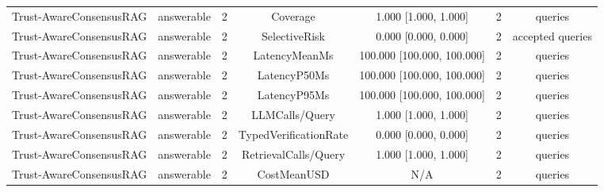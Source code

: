 {\begin{tabular}{lcccccc}
Trust-AwareConsensusRAG & answerable & 2 & Coverage & 1.000 [1.000, 1.000] & 2 & queries \\
Trust-AwareConsensusRAG & answerable & 2 & SelectiveRisk & 0.000 [0.000, 0.000] & 2 & accepted queries \\
Trust-AwareConsensusRAG & answerable & 2 & LatencyMeanMs & 100.000 [100.000, 100.000] & 2 & queries \\
Trust-AwareConsensusRAG & answerable & 2 & LatencyP50Ms & 100.000 [100.000, 100.000] & 2 & queries \\
Trust-AwareConsensusRAG & answerable & 2 & LatencyP95Ms & 100.000 [100.000, 100.000] & 2 & queries \\
Trust-AwareConsensusRAG & answerable & 2 & LLMCalls/Query & 1.000 [1.000, 1.000] & 2 & queries \\
Trust-AwareConsensusRAG & answerable & 2 & TypedVerificationRate & 0.000 [0.000, 0.000] & 2 & queries \\
Trust-AwareConsensusRAG & answerable & 2 & RetrievalCalls/Query & 1.000 [1.000, 1.000] & 2 & queries \\
Trust-AwareConsensusRAG & answerable & 2 & CostMeanUSD & N/A & 2 & queries \\
\end{tabular}
}
